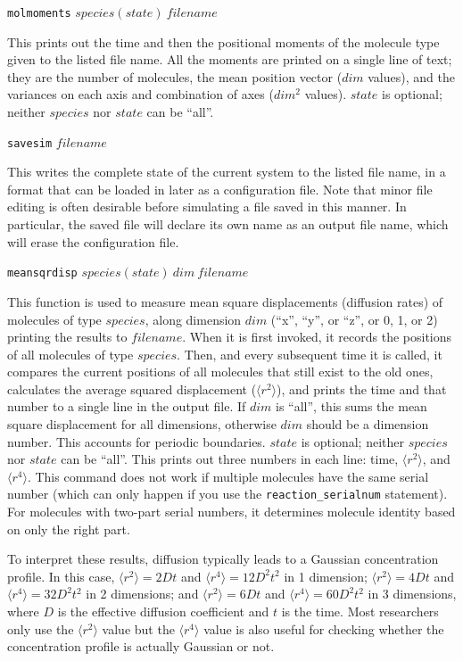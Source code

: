 \documentclass {scrbook}
\newcommand {\ttt} {\texttt}
\begin{document}
\begin{description}
\item{\ttt{molmoments} $species(state)\ filename$}

This prints out the time and then the positional moments of the molecule type given to the listed file name. All the moments are printed on a single line of text; they are the number of molecules, the mean position vector ($dim$ values), and the variances on each axis and combination of axes ($dim^2$ values). $state$ is optional; neither $species$ nor $state$ can be ``all''.

\item{\ttt{savesim} $filename$}

This writes the complete state of the current system to the listed file name, in a format that can be loaded in later as a configuration file. Note that minor file editing is often desirable before simulating a file saved in this manner. In particular, the saved file will declare its own name as an output file name, which will erase the configuration file.

\item{\ttt{meansqrdisp} $species(state)\ dim\ filename$}

This function is used to measure mean square displacements (diffusion rates) of molecules of type $species$, along dimension $dim$ (``x'', ``y'', or ``z'', or 0, 1, or 2) printing the results to $filename$. When it is first invoked, it records the positions of all molecules of type $species$. Then, and every subsequent time it is called, it compares the current positions of all molecules that still exist to the old ones, calculates the average squared displacement ($\langle r^2 \rangle$), and prints the time and that number to a single line in the output file. If $dim$ is ``all'', this sums the mean square displacement for all dimensions, otherwise $dim$ should be a dimension number. This accounts for periodic boundaries. $state$ is optional; neither $species$ nor $state$ can be ``all''. This prints out three numbers in each line: time, $\langle r^2 \rangle$, and $\langle r^4 \rangle$. This command does not work if multiple molecules have the same serial number (which can only happen if you use the \ttt{reaction\_serialnum} statement). For molecules with two-part serial numbers, it determines molecule identity based on only the right part.

To interpret these results, diffusion typically leads to a Gaussian concentration profile. In this case, $\langle r^2 \rangle = 2Dt$ and $\langle r^4 \rangle = 12D^2t^2$ in 1 dimension; $\langle r^2 \rangle = 4Dt$ and $\langle r^4 \rangle = 32D^2t^2$ in 2 dimensions; and $\langle r^2 \rangle = 6Dt$ and $\langle r^4 \rangle = 60D^2t^2$ in 3 dimensions, where $D$ is the effective diffusion coefficient and $t$ is the time. Most researchers only use the $\langle r^2 \rangle$ value but the $\langle r^4 \rangle$ value is also useful for checking whether the concentration profile is actually Gaussian or not.


\end{description}
\end{document}
